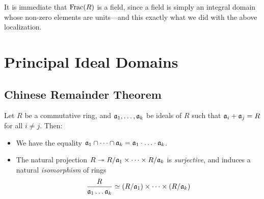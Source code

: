 It is immediate that \(\operatorname{Frac}(R)\) is a field, since a field is simply an
integral domain whose non-zero elements are units---and this exactly what we did
with the above localization.

\section{Principal Ideal Domains}

\subsection{Chinese Remainder Theorem}

\begin{theorem}
\label{thm:chinese-remainder-theorem}
Let \(R\) be a commutative ring, and \(\mathfrak{a}_1, \dots, \mathfrak{a}_k\)
be ideals of \(R\) such that \(\mathfrak{a}_i + \mathfrak{a}_j = R\) for all
\(i \neq j\). Then:
\begin{itemize}\setlength\itemsep{0em}
\item We have the equality \(\mathfrak{a}_1 \cap \dots \cap \mathfrak{a}_k =
  \mathfrak{a}_1 \cdot \ldots \cdot \mathfrak{a}_k\).
\item The natural projection
  \(R \twoheadrightarrow R/\mathfrak{a}_1 \times \dots \times R/\mathfrak{a}_k\) is
  \emph{surjective}, and induces a natural \emph{isomorphism} of rings
  \[
  \frac{R}{\mathfrak{a}_1 \dots \mathfrak{a}_k}
  \simeq (R/\mathfrak{a}_1) \times \dots \times (R/\mathfrak{a}_{k})
  \]
\end{itemize}
\end{theorem}


